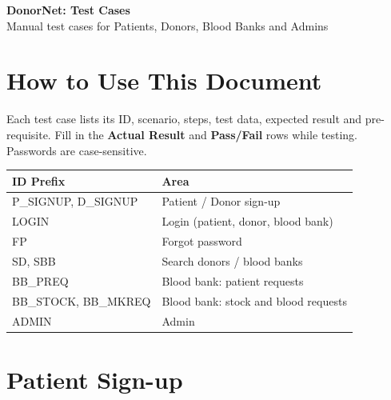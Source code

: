 \documentclass[11pt]{article}
\begin{document}
\begin{center}
    {\LARGE \textbf{DonorNet: Test Cases}}\\[0.5em]
    {\large Manual test cases for Patients, Donors, Blood Banks and Admins}
\end{center}

\vspace{0.5em}

\section*{How to Use This Document}
Each test case lists its ID, scenario, steps, test data, expected result and pre-requisite. Fill in the \textbf{Actual Result} and \textbf{Pass/Fail} rows while testing. Passwords are case-sensitive.

\begin{center}
\begin{tabular}{@{}ll@{}}
\toprule
\textbf{ID Prefix} & \textbf{Area} \\
\midrule
P\_SIGNUP, D\_SIGNUP & Patient / Donor sign-up \\
LOGIN & Login (patient, donor, blood bank) \\
FP & Forgot password \\
SD, SBB & Search donors / blood banks \\
BB\_PREQ & Blood bank: patient requests \\
BB\_STOCK, BB\_MKREQ & Blood bank: stock and blood requests \\
ADMIN & Admin \\
\bottomrule
\end{tabular}
\end{center}

\tableofcontents
\newpage

\section{Patient Sign-up}
\end{document}
